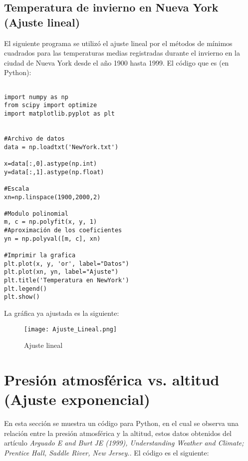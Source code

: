 \documentclass[a4 paper]{article}
\numberwithin{equation}{section}
\newcommand{\0}{\mathbf{0}}
\begin{document}
\subsection*{Temperatura de invierno en Nueva York (Ajuste lineal)}

El siguiente programa se utiliz\'o el ajuste lineal por el m\'etodos de m\'inimos cuadrados para las temperaturas medias registradas durante el invierno en la ciudad de Nueva York desde el a\~{n}o 1900 hasta 1999. El c\'odigo que es (en Python): 

\begin{verbatim}

import numpy as np
from scipy import optimize
import matplotlib.pyplot as plt


#Archivo de datos
data = np.loadtxt('NewYork.txt')

x=data[:,0].astype(np.int)
y=data[:,1].astype(np.float)

#Escala 
xn=np.linspace(1900,2000,2)

#Modulo polinomial
m, c = np.polyfit(x, y, 1)
#Aproximación de los coeficientes
yn = np.polyval([m, c], xn)

#Imprimir la grafica
plt.plot(x, y, 'or', label="Datos")
plt.plot(xn, yn, label="Ajuste")
plt.title('Temperatura en NewYork')
plt.legend()
plt.show()

\end{verbatim}

\newpage
La gr\'afica ya ajustada es la siguiente:

\begin{figure}[!ht]
  \centering
      \texttt{[image: Ajuste\_Lineal.png]}
  \caption{Ajuste lineal}
\end{figure}

\section*{Presi\'on atmosf\'erica vs. altitud (Ajuste exponencial)}

En esta secci\'on se muestra un c\'odigo para Python, en el cual se observa una relaci\'on entre la presi\'on atmosf\'erica y la altitud, estos datos obtenidos del art\'iculo {\it{Arguado E and Burt JE (1999), Understanding Weather and Climate; Prentice Hall, Saddle River, New Jersey.}}. El c\'odigo es el siguiente:
\end{document}
